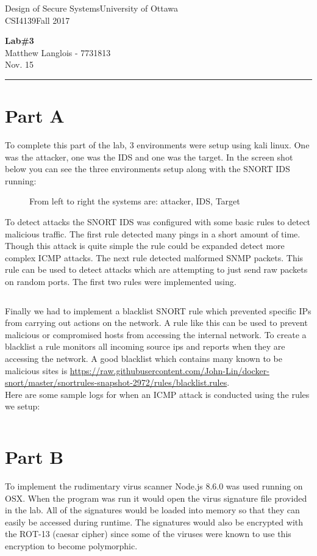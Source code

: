 \documentclass[fleqn, 12pt]{article}
\newcommand{\university}{University of Ottawa}
\newcommand{\name}{Matthew Langlois}
\newcommand{\studentNumber}{7731813}
\newcommand{\semester}{Fall 2017}
\newcommand{\assignmentType}{Lab}
\newcommand{\assignmentNumber}{3}
\newcommand{\dueDate}{Nov. 15}
\newcommand{\courseCode}{CSI4139}
\newcommand{\courseTitle}{Design of Secure Systems}
\newcommand{\essayTitle}{<Title>} %
\newcommand{\essaySubtitle}{<subtitle>} %
\newcommand{\essayAbstract}{} %
\newcommand{\codefile}{\inputminted}
\newcommand{\beginassignemnt}{
    \newlength\tindent
    \setlength{\tindent}{\parindent}
    \setlength{\parindent}{0pt}

    \thispagestyle{assignment}
    \noindent
    \courseTitle \hfill \university\\
    \courseCode \hfill \semester
    \begin{center}
        \textbf{\assignmentType\text{ }\#\assignmentNumber}\\
        \name \hspace{1pt} - \studentNumber\\
        \dueDate\\
    \end{center}
    \vspace{6pt}
    \hrule
    \vspace{1.5\headsep}
}
\newcommand{\beginessay}{
    \nocite{*}

    \pagestyle{frontmatter}
    \pagenumbering{roman}

    \begin{center}
        \normalsize
        \textsc{\university}\\[5cm]
        \LARGE \textbf{\MakeUppercase{\essayTitle}}\\[0.5cm]
        \large \text{ }\essaySubtitle\text{ }\\[10cm] %
        \normalsize
        \textsc{\name}\\
        \textsc{\studentNumber}\\
        \textsc{\courseCode}\\
        \textsc{\semester}\\
        \textsc{\dueDate}
    \end{center}
    \thispagestyle{empty}

    \newpage
    \tableofcontents
    \newpage

    \iftotalfigures
        \addcontentsline{toc}{section}{\listfigurename}
        \listoffigures
    \fi
    \iftotaltables
        \addcontentsline{toc}{section}{\listtablename}
        \listoftables
    \fi

    \ifdefempty{\essayAbstract}{}{
        \newpage
        \addcontentsline{toc}{section}{Abstract}
        \begin{abstract}
            \essayAbstract
        \end{abstract}

    }
    \label{EndFrontMatter}
    \newpage

    \pagenumbering{arabic}
    \pagestyle{body}
}
\begin{document}
\beginassignemnt


\section*{Part A}

To complete this part of the lab, 3 environments were setup using kali linux. One was the attacker, one was the IDS and one was the target. In the screen shot below you can see the three environments setup along with the SNORT IDS running:\\


\begin{figure}[H]
    \caption{From left to right the systems are: attacker, IDS, Target}
\end{figure}

To detect attacks the SNORT IDS was configured with some basic rules to detect malicious traffic. The first rule detected many pings in a short amount of time. Though this attack is quite simple the rule could be expanded detect more complex ICMP attacks. The next rule detected malformed SNMP packets. This rule can be used to detect attacks which are attempting to just send raw packets on random ports. The first two rules were implemented using.

\newpage

\codefile{bash}{rules.sh}

Finally we had to implement a blacklist SNORT rule which prevented specific IPs from carrying out actions on the network. A rule like this can be used to prevent malicious or compromised hosts from accessing the internal network. To create a blacklist a rule monitors all incoming source ips and reports when they are accessing the network. A good blacklist which contains many known to be malicious sites is \url{https://raw.githubusercontent.com/John-Lin/docker-snort/master/snortrules-snapshot-2972/rules/blacklist.rules}.\\

Here are some sample logs for when an ICMP attack is conducted using the rules we setup:

\codefile{text}{logs.log}

\section*{Part B}

To implement the rudimentary virus scanner Node.js 8.6.0 was used running on OSX. When the program was run it would open the virus signature file provided in the lab. All of the signatures would be loaded into memory so that they can easily be accessed during runtime. The signatures would also be encrypted with the ROT-13 (caesar cipher) since some of the viruses were known to use this encryption to become polymorphic.\\
\end{document}
